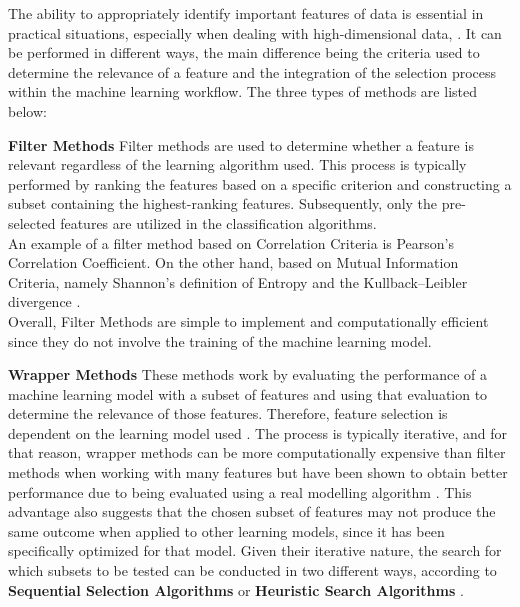 The ability to appropriately identify important features of data is essential in practical situations, especially when dealing with high-dimensional data, \cite{featureSelectionStudyofSeveralMethods}.
It can be performed in different ways, the main difference being the criteria used to determine the relevance of a feature and the integration of the selection process within the machine learning workflow.  The three types of methods are listed below:
\begin{description}
\item \textbf{Filter Methods}
Filter methods are used to determine whether a feature is relevant regardless of the learning algorithm used. This process is typically performed by ranking the features based on a specific criterion and constructing a subset containing the highest-ranking features. Subsequently, only the pre-selected features are utilized in the classification algorithms.\\
An example of a filter method based on Correlation Criteria is Pearson's Correlation Coefficient. On the other hand, based  on Mutual Information Criteria, namely Shannon's definition of Entropy and the Kullback–Leibler divergence \cite{featureSelection_embedded}.\\
Overall, Filter Methods are simple to implement and computationally efficient since they do not involve the training of the machine learning model. 

\item \textbf{Wrapper Methods}
These methods work by evaluating the performance of a machine learning model with a subset of features and using that evaluation to determine the relevance of those features. Therefore, feature selection is dependent on the learning model used \cite{featureSelection_wrapper}. 
The process is typically iterative, and for that reason, wrapper methods can be more computationally expensive than filter methods when working with many features \cite{featureSelection_Wrapper_knn} but have been shown to obtain better performance due to being evaluated using a real modelling algorithm \cite{featureSelectionWithApplications}. This advantage also suggests that the chosen subset of features may not produce the same outcome when applied to other learning models, since it has been specifically optimized for that model.
Given their iterative nature, the search for which subsets to be tested can be conducted in two different ways, according to \textbf{Sequential Selection Algorithms} or \textbf{Heuristic Search Algorithms} \cite{featureSelection_embedded}.


\end{description}
